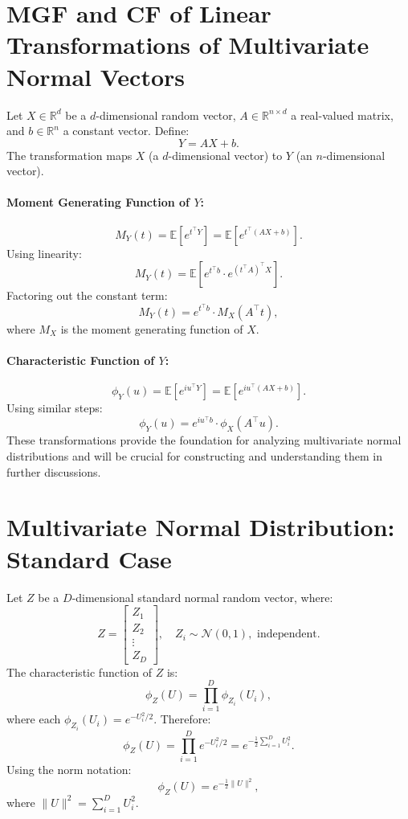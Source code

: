 \section{MGF and CF of Linear Transformations of Multivariate Normal Vectors}
    
    Let \( X \in \mathbb{R}^d \) be a \( d \)-dimensional random vector, \( A \in \mathbb{R}^{n \times d} \) a real-valued matrix, and \( b \in \mathbb{R}^n \) a constant vector. Define:
    \[
    Y = AX + b.
    \]
    The transformation maps \( X \) (a \( d \)-dimensional vector) to \( Y \) (an \( n \)-dimensional vector).  
    \paragraph{Moment Generating Function of \( Y \):}
    \[
    M_Y(t) = \mathbb{E}\left[e^{t^\top Y}\right] = \mathbb{E}\left[e^{t^\top (AX + b)}\right].
    \]
    Using linearity:
    \[
    M_Y(t) = \mathbb{E}\left[e^{t^\top b} \cdot e^{(t^\top A)^\top X}\right].
    \]
    Factoring out the constant term:
    \[
    M_Y(t) = e^{t^\top b} \cdot M_X(A^\top t),
    \]
    where \( M_X \) is the moment generating function of \( X \).
    \paragraph{Characteristic Function of \( Y \):}
    \[
    \phi_Y(u) = \mathbb{E}\left[e^{iu^\top Y}\right] = \mathbb{E}\left[e^{iu^\top (AX + b)}\right].
    \]
    Using similar steps:
    \[
    \phi_Y(u) = e^{iu^\top b} \cdot \phi_X(A^\top u).
    \]
    These transformations provide the foundation for analyzing multivariate normal distributions and will be crucial for constructing and understanding them in further discussions.

\section{Multivariate Normal Distribution: Standard Case}

Let \( Z \) be a \( D \)-dimensional standard normal random vector, where:
\[
Z = \begin{bmatrix} Z_1 \\ Z_2 \\ \vdots \\ Z_D \end{bmatrix}, \quad Z_i \sim \mathcal{N}(0, 1), \text{ independent}.
\]
The characteristic function of \( Z \) is:
\[
\phi_Z(U) = \prod_{i=1}^D \phi_{Z_i}(U_i),
\]
where each \( \phi_{Z_i}(U_i) = e^{-U_i^2 / 2} \). Therefore:
\[
\phi_Z(U) = \prod_{i=1}^D e^{-U_i^2 / 2} = e^{-\frac{1}{2} \sum_{i=1}^D U_i^2}.
\]
Using the norm notation:
\[
\phi_Z(U) = e^{-\frac{1}{2} \|U\|^2},
\]
where \( \|U\|^2 = \sum_{i=1}^D U_i^2 \).

